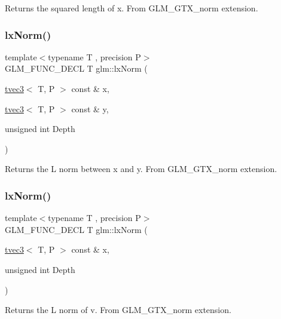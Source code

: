 Returns the squared length of x. From G\+L\+M\+\_\+\+G\+T\+X\+\_\+norm extension. \mbox{\label{group__gtx__norm_ga932bb0854e5c5a6ab5a14b023c451ca7}} 
\subsubsection{\texorpdfstring{lx\+Norm()}{lxNorm()}\hspace{0.1cm}{\footnotesize\ttfamily [1/2]}}
{\footnotesize\ttfamily template$<$typename T , precision P$>$ \\
G\+L\+M\+\_\+\+F\+U\+N\+C\+\_\+\+D\+E\+CL T glm\+::lx\+Norm (\begin{DoxyParamCaption}\item[{\hyperlink{structglm_1_1tvec3}{tvec3}$<$ T, P $>$ const \&}]{x,  }\item[{\hyperlink{structglm_1_1tvec3}{tvec3}$<$ T, P $>$ const \&}]{y,  }\item[{unsigned int}]{Depth }\end{DoxyParamCaption})}

Returns the L norm between x and y. From G\+L\+M\+\_\+\+G\+T\+X\+\_\+norm extension. \mbox{\label{group__gtx__norm_gaab931b0d1acfe2f9c1cb78311edf24fc}} 
\subsubsection{\texorpdfstring{lx\+Norm()}{lxNorm()}\hspace{0.1cm}{\footnotesize\ttfamily [2/2]}}
{\footnotesize\ttfamily template$<$typename T , precision P$>$ \\
G\+L\+M\+\_\+\+F\+U\+N\+C\+\_\+\+D\+E\+CL T glm\+::lx\+Norm (\begin{DoxyParamCaption}\item[{\hyperlink{structglm_1_1tvec3}{tvec3}$<$ T, P $>$ const \&}]{x,  }\item[{unsigned int}]{Depth }\end{DoxyParamCaption})}

Returns the L norm of v. From G\+L\+M\+\_\+\+G\+T\+X\+\_\+norm extension. 